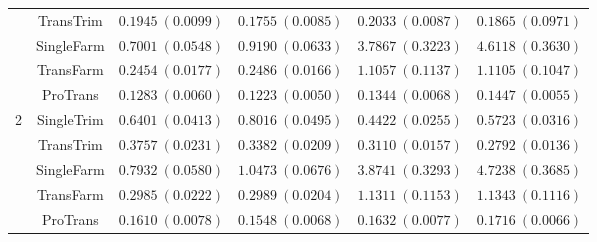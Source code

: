\documentclass[12pt]{article}
\begin{document}
\begin{table}[!ht]
\begin{tabular}{cccccc}
        & TransTrim  & $0.1945\ (0.0099)$ & $0.1755\ (0.0085)$ & $0.2033\ (0.0087)$& $0.1865\ (0.0971)$ \\
        & SingleFarm  & $0.7001\ (0.0548)$ & $0.9190\ (0.0633)$ & $3.7867\ (0.3223)$ & $4.6118\ (0.3630)$ \\
        & TransFarm  & $0.2454\ (0.0177)$ & $0.2486\ (0.0166)$ & $1.1057\ (0.1137)$ & $1.1105\ (0.1047)$ \\
        & ProTrans   & $\bm{0.1283}\ (0.0060)$ & $\bm{0.1223}\ (0.0050)$ & $\bm{0.1344}\ (0.0068)$ & $\bm{0.1447}\ (0.0055)$ \\
         \hline
        \multirow{5}{*}{2} 
        & SingleTrim  & $0.6401\ (0.0413)$& $0.8016\ (0.0495)$  & $0.4422\ (0.0255)$ & $0.5723\ (0.0316)$ \\
        & TransTrim   & $0.3757\ (0.0231)$  & $0.3382\ (0.0209)$  & $0.3110\ (0.0157)$ & $0.2792\ (0.0136)$ \\
        & SingleFarm & $0.7932\ (0.0580)$  & $1.0473\ (0.0676)$  & $3.8741\ (0.3293)$ & $4.7238\ (0.3685)$ \\
        & TransFarm  & $0.2985\ (0.0222)$ & $0.2989\ (0.0204)$& $1.1311\ (0.1153)$ & $1.1343\ (0.1116)$ \\
        & ProTrans  & $\bm{0.1610}\ (0.0078)$  & $\bm{0.1548}\ (0.0068)$ & $\bm{0.1632}\ (0.0077)$ & $\bm{0.1716}\ (0.0066)$ \\
        \bottomrule
    \end{tabular}
\end{table}  
\end{document}
